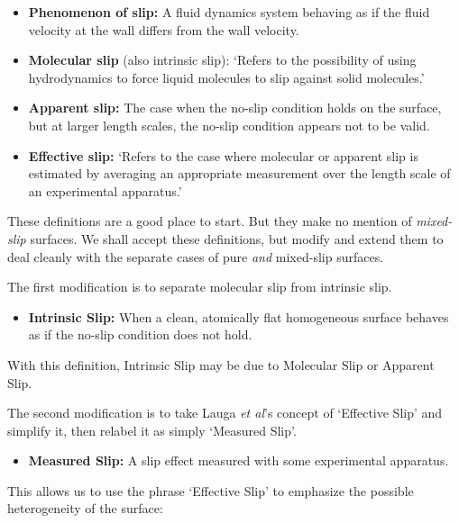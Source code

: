 \documentclass[12pt, a4paper, twoside, openright]{book}
\begin{document}
\begin{itemize}

\item \textbf{Phenomenon of slip:} A fluid dynamics system behaving as if the fluid velocity at the wall differs from the wall velocity.

\item \textbf{Molecular slip} (also intrinsic slip): `Refers to the possibility of using hydrodynamics to force liquid molecules to slip against solid molecules.'

\item \textbf{Apparent slip:} The case when the no-slip condition holds on the surface, but at larger length scales, the no-slip condition appears not to be valid.

\item \textbf{Effective slip:} `Refers to the case where molecular or apparent slip is estimated by averaging an appropriate measurement over the length scale of an experimental apparatus.'

\end{itemize}


These definitions are a good place to start.  But they make no mention of \emph{mixed-slip} surfaces.  We shall accept these definitions, but modify and extend them to deal cleanly with the separate cases of pure \emph{and} mixed-slip surfaces.

The first modification is to separate molecular slip from intrinsic slip.

\begin{itemize}
\item \textbf{Intrinsic Slip:} When a clean, atomically flat homogeneous surface behaves as if the no-slip condition does not hold.
\end{itemize}

With this definition, Intrinsic Slip may be due to Molecular Slip or Apparent Slip.

The second modification is to take Lauga \emph{et al}'s concept of `Effective Slip' and simplify it, then relabel it as simply `Measured Slip'.

\begin{itemize}
\item \textbf{Measured Slip:} A slip effect measured with some experimental apparatus.
\end{itemize}

This allows us to use the phrase `Effective Slip' to emphasize the possible heterogeneity of the surface:
\end{document}
